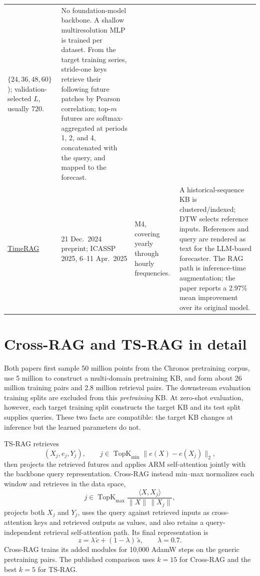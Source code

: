 \documentclass[10pt]{article}
\begin{document}
\begin{longtable}{p{.14\linewidth}p{.17\linewidth}p{.27\linewidth}p{.31\linewidth}}
$\{24,36,48,60\}$); validation-selected $L$, usually 720.
& No foundation-model backbone. A shallow multiresolution MLP is trained per
dataset. From the target training series, stride-one keys retrieve their
following future patches by Pearson correlation; top-$m$ futures are
softmax-aggregated at periods 1, 2, and 4, concatenated with the query, and
mapped to the forecast.\\
\addlinespace
\href{https://arxiv.org/abs/2412.16643}{TimeRAG}
& 21 Dec.\ 2024 preprint; ICASSP 2025, 6--11 Apr.\ 2025
& M4, covering yearly through hourly frequencies.
& A historical-sequence KB is clustered/indexed; DTW selects reference
inputs. References and query are rendered as text for the LLM-based
forecaster. The RAG path is inference-time augmentation; the paper reports a
2.97\% mean improvement over its original model.\\
\bottomrule
\end{longtable}
\normalsize

\section{Cross-RAG and TS-RAG in detail}
Both papers first sample 50 million points from the Chronos pretraining corpus,
use 5 million to construct a multi-domain pretraining KB, and form about
26 million training pairs and 2.8 million retrieval pairs.  The downstream
evaluation training splits are excluded from this \emph{pretraining} KB.  At
zero-shot evaluation, however, each target training split constructs the
target KB and its test split supplies queries.  These two facts are compatible:
the target KB changes at inference but the learned parameters do not.

TS-RAG retrieves
\[
 (X_j,e_j,Y_j),\qquad
 j\in\operatorname{TopK}_{\min}\|e(X)-e(X_j)\|_2,
\]
then projects the retrieved futures and applies ARM self-attention jointly
with the backbone query representation. Cross-RAG instead min--max normalizes
each window and retrieves in the data space,
\[
 j\in\operatorname{TopK}_{\max}
 \frac{\langle X,X_j\rangle}{\|X\|\,\|X_j\|},
\]
projects both $X_j$ and $Y_j$, uses the query against retrieved inputs as
cross-attention keys and retrieved outputs as values, and also retains a
query-independent retrieval self-attention path. Its final representation is
\[
 z=\lambda\,\widetilde c+(1-\lambda)\,\widetilde s,\qquad \lambda=0.7.
\]
Cross-RAG trains its added modules for 10,000 AdamW steps on the generic
pretraining pairs. The published comparison uses $k=15$ for Cross-RAG and the
best $k=5$ for TS-RAG.
\end{document}
